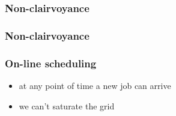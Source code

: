 \begin{frame}
	\frametitle{Non-clairvoyance}
	\center
	\begin{minipage}[b]{\textwidth}
		
	\end{minipage}
\end{frame}

\begin{frame}
	\frametitle{Non-clairvoyance}
	\center
	\begin{minipage}[b]{\textwidth}
		
	\end{minipage}
\end{frame}

\begin{frame}
	\frametitle{On-line scheduling}
	\begin{itemize}
		\item at any point of time a new job can arrive
		\item we can't saturate the grid
	\end{itemize}
\end{frame}

{
\frame{}
}

